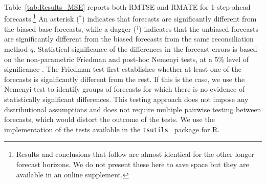 \documentclass[12pt]{article}
\theoremstyle{definition}
\begin{document}
{{Table~\ref{tab:Results_MSE} reports both RMTSE and RMATE for 1-step-ahead forecasts.\footnote{{\color{blue} Results and conclusions that follow are almost identical for the other longer forecast horizons. We do not present these here to save space but they are available in an online supplement.}}  An asterisk ($^\ast$) indicates that forecasts are significantly different from the biased base forecasts, while a dagger ($^\dag$) indicates that the unbiased forecasts are significantly different from the biased forecasts from the same reconciliation method $q$. Statistical significance of the differences in the forecast errors is based on the non-parametric Friedman and post-hoc Nemenyi tests, at a 5\% level of significance \citep{HolEtAl2013}. The Friedman test first establishes whether at least one of the forecasts is significantly different from the rest. If this is the case, we use the Nemenyi test to identify groups of forecasts for which there is no evidence of statistically significant differences. This testing approach does not impose any distributional assumptions and does not require multiple pairwise testing between forecasts, which would distort the outcome of the tests. We use the implementation of the tests available in the \verb"tsutils " \citep{tsutils} package for R.}

}
\end{document}
